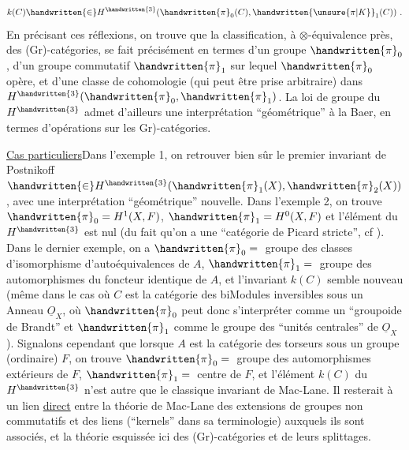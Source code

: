 \[
k(C)\handwritten{\in}H^{\handwritten{3}}(\handwritten{\pi}_{0}(C),\handwritten{\unsure{\pi|K}}_{1}(C))\ .
\]
En précisant ces réflexions, on trouve que la classification, à $\otimes$-équivalence près, des (Gr)-catégories, se fait précisément en termes d'un groupe $\handwritten{\pi}_{0}$, d'un groupe commutatif $\handwritten{\pi}_{1}$ sur lequel $\handwritten{\pi}_{0}$ opère, et d'une classe de cohomologie (qui peut être prise arbitraire) dans $H^{\handwritten{3}}(\handwritten{\pi}_{0},\handwritten{\pi}_{1})$. La loi de  groupe du $H^{\handwritten{3}}$ admet d'ailleurs une interprétation ``géométrique'' à la Baer, en termes d'opérations sur les \handwritten{(}Gr)-catégories.

\uline{Cas particuliers}\quad Dans l'exemple 1, on  retrouver bien sûr le premier invariant de Postnikoff $\handwritten{\in}H^{\handwritten{3}}(\handwritten{\pi}_{1}(X),\handwritten{\pi}_{2}(X))$, avec une interprétation ``géo\deleted{(}métrique'' nouvelle. Dans l'exemple 2, on trouve $\handwritten{\pi}_{0}=H^{1}(X,F)$, $\handwritten{\pi}_{1}=H^{0}(X,F)$\handwritten{,} et l'élément du $H^{\handwritten{3}}$ est nul (du fait qu'on a une ``catégorie de Picard stricte'', cf \handwritten{[\, ]}). Dans  le dernier exemple, on a $\handwritten{\pi}_{0}={}$ groupe des classes d'isomorphisme d'autoéquivalences de $A$, $\handwritten{\pi}_{1}={}$ groupe des automorphismes du foncteur identique de $A$, et l'invariant $k(C)$ semble nouveau (même dans le cas où $C$ est la catégorie des biModules inversibles sous un Anneau $\underline{O}_{X}$, où $\handwritten{\pi}_{0}$ peut donc s'interpréter comme un ``groupoide de Brandt'' et $\handwritten{\pi}_{1}$ comme le groupe des ``unités centrales'' de $\underline{O}_{X}$). Signalons cependant que lorsque $A$ est la catégorie des torseurs sous un groupe (ordinaire) $F$, on trouve  $\handwritten{\pi}_{0}={}$ groupe des automorphismes extérieurs de $F$, $\handwritten{\pi}_{1}={}$ centre de $F$, et l'élément $k(C)$ du $H^{\handwritten{3}}$ n'est autre que le classique invariant de Mac-Lane. Il resterait à  un lien  \uline{direct} entre la théorie de Mac-Lane des extensions de groupes non commutatifs et des liens (``kernels''\deleted{\unsure{)|,}} dans sa terminologie) auxquels ils sont associés, et la théorie  esquissée ici des (Gr)-catégories et de leurs splittages.

